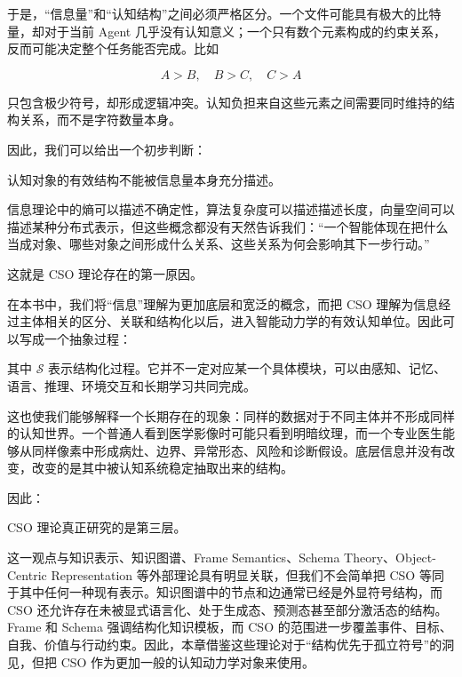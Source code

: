 于是，“信息量”和“认知结构”之间必须严格区分。一个文件可能具有极大的比特量，却对于当前 Agent 几乎没有认知意义；一个只有数个元素构成的约束关系，反而可能决定整个任务能否完成。比如

\[
A>B,\quad B>C,\quad C>A
\]

只包含极少符号，却形成逻辑冲突。认知负担来自这些元素之间需要同时维持的结构关系，而不是字符数量本身。

因此，我们可以给出一个初步判断：

\begin{proposition*}
认知对象的有效结构不能被信息量本身充分描述。
\end{proposition*}

信息理论中的熵可以描述不确定性，算法复杂度可以描述描述长度，向量空间可以描述某种分布式表示，但这些概念都没有天然告诉我们：“一个智能体现在把什么当成对象、哪些对象之间形成什么关系、这些关系为何会影响其下一步行动。”

这就是 CSO 理论存在的第一原因。

在本书中，我们将“信息”理解为更加底层和宽泛的概念，而把 CSO 理解为信息经过主体相关的区分、关联和结构化以后，进入智能动力学的有效认知单位。因此可以写成一个抽象过程：

\begin{statementbox}
\centering
{}
\end{statementbox}

其中 \(\mathcal S\) 表示结构化过程。它并不一定对应某一个具体模块，可以由感知、记忆、语言、推理、环境交互和长期学习共同完成。

这也使我们能够解释一个长期存在的现象：同样的数据对于不同主体并不形成同样的认知世界。一个普通人看到医学影像时可能只看到明暗纹理，而一个专业医生能够从同样像素中形成病灶、边界、异常形态、风险和诊断假设。底层信息并没有改变，改变的是其中被认知系统稳定抽取出来的结构。

因此：

\begin{statementbox}
\centering
{}
\end{statementbox}

CSO 理论真正研究的是第三层。

这一观点与知识表示、知识图谱、Frame Semantics、Schema Theory、Object-Centric Representation 等外部理论具有明显关联，但我们不会简单把 CSO 等同于其中任何一种现有表示。知识图谱中的节点和边通常已经是外显符号结构，而 CSO 还允许存在未被显式语言化、处于生成态、预测态甚至部分激活态的结构。Frame 和 Schema 强调结构化知识模板，而 CSO 的范围进一步覆盖事件、目标、自我、价值与行动约束。因此，本章借鉴这些理论对于“结构优先于孤立符号”的洞见，但把 CSO 作为更加一般的认知动力学对象来使用。


